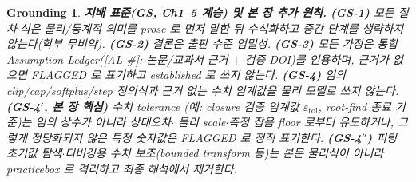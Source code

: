 \documentclass[11pt,a4paper]{article}
\newtheorem*{groundingbox}{Grounding}
\newcommand{\tol}{\mathrm{tol}}
\newcommand{\AL}[1]{\textsf{[AL-#1]}}
\begin{document}
\begin{groundingbox}
\textbf{지배 표준(GS, Ch1--5 계승) 및 본 장 추가 원칙.} \textbf{(GS-1)} 모든 절차$\cdot$식은 물리/통계적 의미를
prose 로 먼저 말한 뒤 수식화하고 중간 단계를 생략하지 않는다(학부 무비약). \textbf{(GS-2)} 결론은 출판 수준
엄밀성. \textbf{(GS-3)} 모든 가정은 통합 Assumption Ledger(\AL{\#}: 논문/교과서 근거 $+$ 검증 DOI)를 인용하며,
근거가 없으면 FLAGGED 로 표기하고 established 로 쓰지 않는다. \textbf{(GS-4)} 임의 clip/cap/softplus/step
정의식과 \emph{근거 없는 수치 임계값}을 물리 모델로 쓰지 않는다. \textbf{(GS-4$'$, 본 장 핵심)} 수치 tolerance
(예: closure 검증 임계값 $\varepsilon_\tol$, root-find 종료 기준)는 \emph{임의 상수가 아니라} 상대오차$\cdot$
물리 scale$\cdot$측정 잡음 floor 로부터 \emph{유도}하거나, 그렇게 정당화되지 않은 특정 숫자값은 FLAGGED 로
정직 표기한다. \textbf{(GS-4$''$)} 피팅 초기값 탐색$\cdot$디버깅용 수치 보조(bounded transform 등)는 본문 물리식이
아니라 practicebox 로 격리하고 최종 해석에서 제거한다.
\end{groundingbox}

\tableofcontents
\newpage

\end{document}
